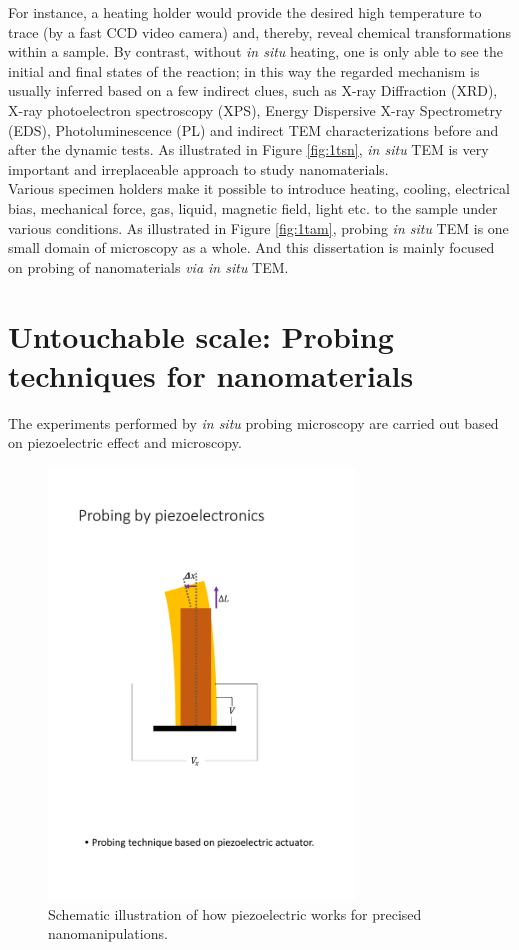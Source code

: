 For instance, a heating holder would provide the desired high temperature to trace (by a fast CCD video camera) and, thereby, reveal chemical transformations within a sample. By contrast, without \emph{in situ} heating, one is  only able to see the initial and final states of the reaction; in this way the regarded mechanism is usually inferred based on a few indirect clues, such as X-ray Diffraction (XRD), X-ray photoelectron spectroscopy (XPS), Energy Dispersive X-ray Spectrometry (EDS), Photoluminescence (PL) and indirect TEM characterizations before and after the dynamic tests. As illustrated in Figure \ref{fig:1tsn}, \emph{in situ} TEM is very important and irreplaceable approach to study nanomaterials. \\

Various specimen holders make it possible to introduce heating, cooling, electrical bias, mechanical force, gas, liquid, magnetic field, light etc. to the sample under various conditions. As illustrated in Figure \ref{fig:1tam}, probing \emph{in situ} TEM is one small domain of microscopy as a whole. And this dissertation is mainly focused on probing of nanomaterials \textit{via in situ} TEM. 

\section{Untouchable scale: Probing techniques for nanomaterials}

The experiments performed by \textit{in situ} probing microscopy are carried out based on piezoelectric effect and microscopy. \\

\begin{figure}  
\centering
\includegraphics[width=230pt]{figures/figure1_piezo.pdf}
\caption[Probing by piezoelectronics]{Schematic illustration of how piezoelectric works for precised nanomanipulations.
\label{fig:1piezo}}
\end{figure}

